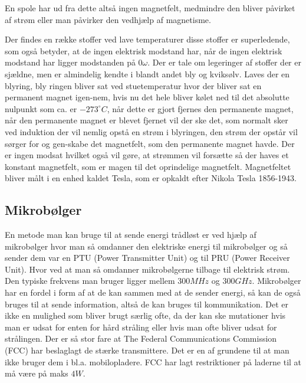 En spole har ud fra dette altså ingen magnetfelt, medmindre den bliver påvirket af strøm eller man påvirker den vedhjælp af magnetisme. 

Der findes en række stoffer ved lave temperaturer disse stoffer er superledende, som også betyder, at de ingen elektrisk modstand har, når de ingen elektrisk modstand har ligger modstanden på $0 \omega$. Der er tale om legeringer af stoffer der er sjældne, men er almindelig kendte i blandt andet bly og kviksølv. Laves der en blyring, bly ringen bliver sat ved stuetemperatur hvor der bliver sat en permanent magnet igen-nem, hvis nu det hele bliver kølet ned til det absolutte nulpunkt som ca. er $-273^\circ C$, når dette er gjort fjernes den permanente magnet, når den permanente magnet er blevet fjernet vil der ske det, som normalt sker ved induktion der vil nemlig opstå en strøm i blyringen, den strøm der opstår vil sørger for og gen-skabe det magnetfelt, som den permanente magnet havde. Der er ingen modsat hvilket også vil gøre, at strømmen vil forsætte så der haves et konstant magnetfelt, som er magen til det oprindelige magnetfelt. Magnetfeltet bliver målt i en enhed kaldet Tesla, som er opkaldt efter Nikola Tesla 1856-1943. 


\subsection{Mikrobølger}

En metode man kan bruge til at sende energi trådløst er ved hjælp af mikrobølger hvor man så omdanner den elektriske energi til mikrobølger og så sender dem var en PTU (Power Transmitter Unit) og til PRU (Power Receiver Unit). Hvor ved at man så omdanner mikrobølgerne tilbage til elektrisk strøm. Den typiske frekvens man bruger ligger mellem $300 MHz$ og $300 GHz$. Mikrobølger har en fordel i form af at de kan sammen med at de sender energi, så kan de også bruges til at sende information, altså de kan bruges til kommunikation.  Det er ikke en mulighed som bliver brugt særlig ofte, da der kan ske mutationer hvis man er udsat for enten for hård stråling eller hvis man ofte bliver udsat for strålingen. Der er så stor fare at The Federal Communications Commission (FCC) har beslaglagt de stærke transmittere. Det er en af grundene til at man ikke bruger dem i bl.a. mobilopladere. FCC har lagt restriktioner på laderne til at må være på maks $4 W$.


